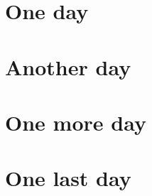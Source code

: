 \documentclass[12pt]{book}
\begin{document}
\section*{One day}

\noindent\lipsum[1]

\section*{Another day}

\noindent\lipsum[1]

\section*{One more day}

\noindent\lipsum[1]

\newpage
\section*{One last day}

\noindent\lipsum[1]
\end{document}
